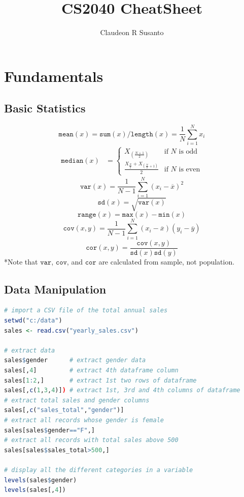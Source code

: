 \documentclass{article}
\title{CS2040 CheatSheet}
\author{Claudeon R Susanto}
\date{}
\begin{document}
\tableofcontents
\section{Fundamentals}
\subsection{Basic Statistics}
$$\texttt{mean}(x) = \texttt{sum}(x)\texttt{/length}(x) = \frac{1}{N} \sum_{i=1}^{N}x_i$$
\begin{equation*}
    \begin{split}
        \texttt{median}(x) & = \left\{
        \begin{array}{ll}
            X_{(\frac{N+1}{2})} & \text{if $N$ is odd}\\
            \frac{X_{\frac{N}{2}} + X_{(\frac{N}{2} + 1)}}{2} & \text{if $N$ is even}
        \end{array}
        \right.
    \end{split}
\end{equation*}
$$\texttt{var}(x) = \frac{1}{N-1}\sum_{i=1}^{N}(x_i - \overline{x})^2$$
$$\texttt{sd}(x) = \sqrt{\texttt{var}(x)}$$
$$\texttt{range}(x) = \texttt{max}(x) - \texttt{min}(x)$$
$$\texttt{cov}(x,y) = \frac{1}{N-1}\sum_{i=1}^{N}(x_i - \overline{x})(y_i - \overline{y})$$
$$\texttt{cor}(x,y) = \frac{\texttt{cov}(x,y)}{\texttt{sd}(x) \texttt{sd}(y)}$$
*Note that $\texttt{var}$, $\texttt{cov}$, and $\texttt{cor}$ are calculated from sample, not population.
\subsection{Data Manipulation}
\begin{lstlisting}[language = R]
# import a CSV file of the total annual sales
setwd("c:/data")
sales <- read.csv("yearly_sales.csv")

# extract data
sales$gender      # extract gender data
sales[,4]         # extract 4th dataframe column
sales[1:2,]       # extract 1st two rows of dataframe
sales[,c(1,3,4)]) # extract 1st, 3rd and 4th columns of dataframe
# extract total sales and gender columns
sales[,c("sales_total","gender")] 
# extract all records whose gender is female
sales[sales$gender=="F",] 
# extract all records with total sales above 500
sales[sales$sales_total>500,]

# display all the different categories in a variable
levels(sales$gender)
levels(sales[,4])

\end{lstlisting}
\end{document}
